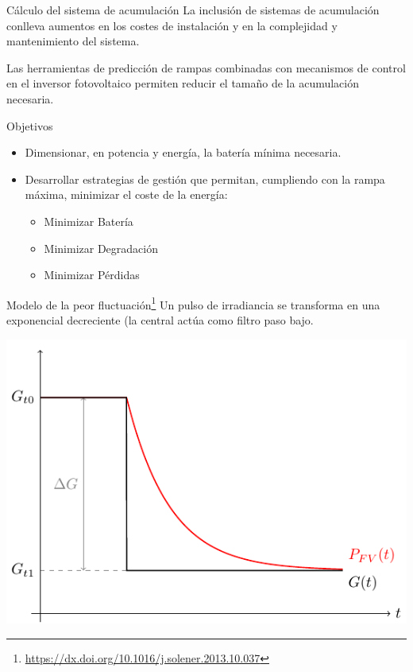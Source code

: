 \documentclass[aspectratio=169, usenames,svgnames,dvipsnames]{beamer}
\begin{document}
\begin{frame}[label={sec:org748b605}]{Cálculo del sistema de acumulación}
La inclusión de sistemas de acumulación conlleva \alert{aumentos en los
costes} de instalación y en la \alert{complejidad y mantenimiento} del
sistema.

Las herramientas de \alert{predicción} de rampas combinadas con \alert{mecanismos de
control en el inversor} fotovoltaico permiten \alert{reducir} el tamaño de la
acumulación necesaria.

\begin{block}{Objetivos}
\begin{itemize}
\item Dimensionar, en \alert{potencia y energía}, la batería mínima necesaria.
\item \alert{Desarrollar estrategias de gestión} que permitan, cumpliendo con la rampa máxima, minimizar el coste de la energía:
\begin{itemize}
\item Minimizar Batería
\item Minimizar Degradación
\item Minimizar Pérdidas
\end{itemize}
\end{itemize}
\end{block}
\end{frame}

\begin{frame}[label={sec:org309b9de}]{Modelo de la peor fluctuación\footnote{\url{https://dx.doi.org/10.1016/j.solener.2013.10.037}}}
Un pulso de irradiancia se transforma en una exponencial decreciente (la central actúa como filtro paso bajo.

\begin{center}
\includegraphics[height=0.7\textheight]{../figs/ModeloPeorFluctuacion0.pdf}
\end{center}
\end{frame}
\end{document}
